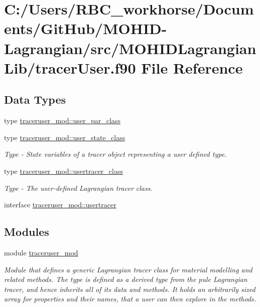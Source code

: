 \hypertarget{tracer_user_8f90}{}\section{C\+:/\+Users/\+R\+B\+C\+\_\+workhorse/\+Documents/\+Git\+Hub/\+M\+O\+H\+I\+D-\/\+Lagrangian/src/\+M\+O\+H\+I\+D\+Lagrangian\+Lib/tracer\+User.f90 File Reference}
\label{tracer_user_8f90}
\subsection*{Data Types}
\begin{DoxyCompactItemize}
\item 
type \mbox{\hyperlink{structtraceruser__mod_1_1user__par__class}{traceruser\+\_\+mod\+::user\+\_\+par\+\_\+class}}
\item 
type \mbox{\hyperlink{structtraceruser__mod_1_1user__state__class}{traceruser\+\_\+mod\+::user\+\_\+state\+\_\+class}}
\begin{DoxyCompactList}\small\item\em Type -\/ State variables of a tracer object representing a user defined type. \end{DoxyCompactList}\item 
type \mbox{\hyperlink{structtraceruser__mod_1_1usertracer__class}{traceruser\+\_\+mod\+::usertracer\+\_\+class}}
\begin{DoxyCompactList}\small\item\em Type -\/ The user-\/defined Lagrangian tracer class. \end{DoxyCompactList}\item 
interface \mbox{\hyperlink{interfacetraceruser__mod_1_1usertracer}{traceruser\+\_\+mod\+::usertracer}}
\end{DoxyCompactItemize}
\subsection*{Modules}
\begin{DoxyCompactItemize}
\item 
module \mbox{\hyperlink{namespacetraceruser__mod}{traceruser\+\_\+mod}}
\begin{DoxyCompactList}\small\item\em Module that defines a generic Lagrangian tracer class for material modelling and related methods. The type is defined as a derived type from the pule Lagrangian tracer, and hence inherits all of it\textquotesingle{}s data and methods. It holds an arbitrarily sized array for properties and their names, that a user can then explore in the methods. \end{DoxyCompactList}\end{DoxyCompactItemize}
